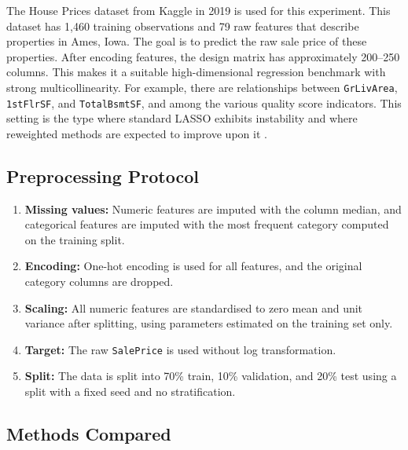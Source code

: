 \documentclass[12pt,a4paper]{article}
\begin{document}
The House Prices dataset from Kaggle in 2019 \citep{kaggle2019} is used for this
experiment. This dataset has 1,460 training observations and 79 raw features that
describe properties in Ames, Iowa. The goal is to predict the raw sale price of these
properties. After encoding features, the design matrix has approximately 200--250
columns. This makes it a suitable high-dimensional regression benchmark with strong
multicollinearity. For example, there are relationships between \texttt{GrLivArea},
\texttt{1stFlrSF}, and \texttt{TotalBsmtSF}, and among the various quality score
indicators. This setting is the type where standard LASSO exhibits instability
\citep{zouhastie2005} and where reweighted methods are expected to improve upon it
\citep{candes2008}.

\subsection{Preprocessing Protocol}

\begin{enumerate}[noitemsep]
    \item \textbf{Missing values:} Numeric features are imputed with the column median,
        and categorical features are imputed with the most frequent category computed
        on the training split.
    \item \textbf{Encoding:} One-hot encoding is used for all features, and the original
        category columns are dropped.
    \item \textbf{Scaling:} All numeric features are standardised to zero mean and unit
        variance after splitting, using parameters estimated on the training set only.
    \item \textbf{Target:} The raw \texttt{SalePrice} is used without log transformation.
    \item \textbf{Split:} The data is split into 70\% train, 10\% validation, and 20\%
        test using a split with a fixed seed and no stratification.
\end{enumerate}

\subsection{Methods Compared}
\end{document}
